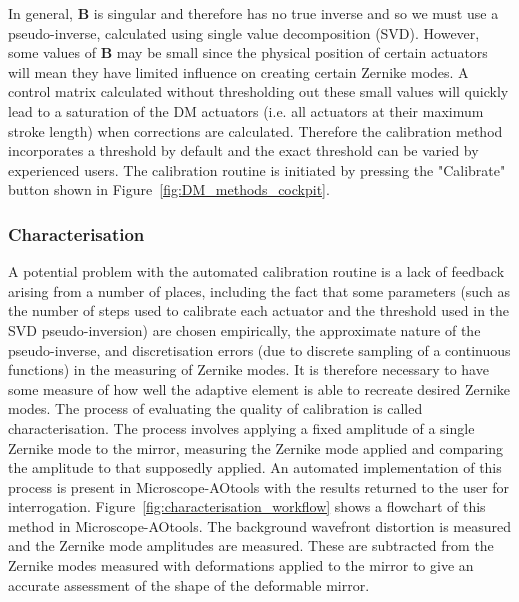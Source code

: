 In general, $\boldsymbol{B}$ is singular and therefore has no true inverse and so we must use a pseudo-inverse, calculated using single value decomposition (SVD). However, some values of $\boldsymbol{B}$ may be small since the physical position of certain actuators will mean they have limited influence on creating certain Zernike modes. A control matrix calculated without thresholding out these small values will quickly lead to a saturation of the DM actuators (i.e. all actuators at their maximum stroke length) when corrections are calculated.\cite{booth2005methods} Therefore the calibration method incorporates a threshold by default and the exact threshold can be varied by experienced users. The calibration routine is initiated by pressing the "Calibrate" button shown in Figure~\ref{fig:DM_methods_cockpit}.

\subsubsection{Characterisation}
\label{subsubsec:characterisation}

A potential problem with the automated calibration routine is a lack of feedback arising from a number of places, including the fact that some parameters (such as the number of steps used to calibrate each actuator and the threshold used in the SVD pseudo-inversion) are chosen empirically,
the approximate nature of the pseudo-inverse, and discretisation errors (due to discrete sampling of a continuous functions) in the measuring of Zernike modes. It is therefore necessary to have some measure of how well the adaptive element is able to recreate desired Zernike modes. The process of evaluating the quality of calibration is called characterisation. The process involves applying a fixed amplitude of a single Zernike mode
to the mirror, measuring the Zernike mode applied and comparing the amplitude to that supposedly applied. An automated implementation of this process is present in Microscope-AOtools with the results returned to the user for interrogation. Figure~\ref{fig:characterisation_workflow} shows a flowchart of this method in Microscope-AOtools. The background wavefront distortion is measured and the Zernike mode amplitudes are measured. These are subtracted from the Zernike modes measured with deformations applied to the mirror to give an accurate assessment of the shape of the deformable
mirror. 

